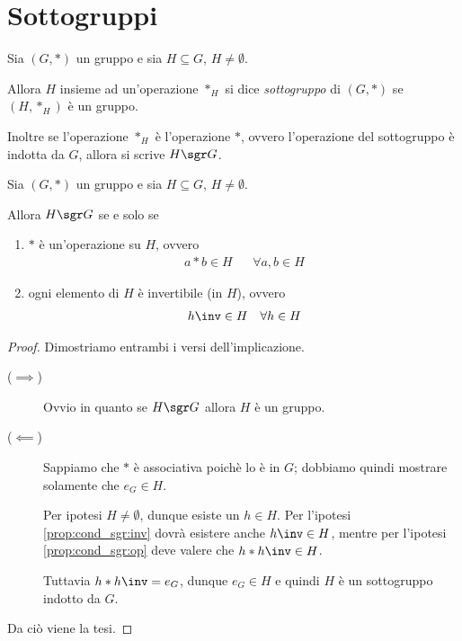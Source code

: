 \section{Sottogruppi}

\begin{definition}[Sottogruppo]\label{def:sottogruppo}
    Sia $(G, *)$ un gruppo e sia $H \subseteq G$, $H \neq \emptyset$.
    
    Allora $H$ insieme ad un'operazione $*_H$ si dice \emph{sottogruppo} di $(G, *)$ se $(H, *_H)$ è un gruppo.

    Inoltre se l'operazione $*_H$ è l'operazione $*$, ovvero l'operazione del sottogruppo è indotta da $G$, allora si scrive $H \sgr G$.
\end{definition}

\begin{proposition}\label{prop:cond_sgr}
    Sia $(G, *)$ un gruppo e sia $H \subseteq G$, $H \neq \emptyset$.

    Allora $H \sgr G$ se e solo se \begin{enumerate}[label={(\roman*)}, ref={\theproposition: (\roman*)}]
        \item \label{prop:cond_sgr:op} $*$ è un'operazione su $H$, ovvero \begin{align*}
            a*b \in H &&\forall a, b \in H
        \end{align*}
        \item \label{prop:cond_sgr:inv} ogni elemento di $H$ è invertibile (in $H$), ovvero \begin{align*}
            h\inv \in H &&\forall h \in H
        \end{align*}
    \end{enumerate}
\end{proposition}
\begin{proof}
    Dimostriamo entrambi i versi dell'implicazione.
    \begin{description}
        \item[($\implies$)] Ovvio in quanto se $H \sgr G$ allora $H$ è un gruppo.
        \item[($\impliedby$)] Sappiamo che $*$ è associativa poichè lo è in $G$; dobbiamo quindi mostrare solamente che $e_G \in H$.
        
        Per ipotesi $H \neq \emptyset$, dunque esiste un $h \in H$. Per l'ipotesi \ref{prop:cond_sgr:inv} dovrà esistere anche $h\inv \in H$, mentre per l'ipotesi \ref{prop:cond_sgr:op} deve valere che $h * h\inv \in H$. 

        Tuttavia $h * h\inv = e_G$, dunque $e_G \in H$ e quindi $H$ è un sottogruppo indotto da $G$. 
    \end{description}

    Da ciò viene la tesi.
\end{proof}

